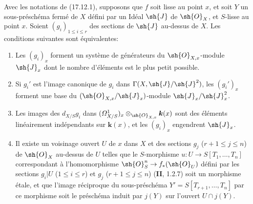 \begin{corollary}[17.12.2]
\label{IV.17.12.2}
Avec les notations de \textup{(17.12.1)}, supposons que $f$ soit lisse au point $x$, et soit $Y$ un sous-préschéma fermé de $X$ défini par un Idéal $\sh{J}$ de $\sh{O}_X$, et $S$-lisse au point $x$. Soient $(g_i)_{1\leq i\leq r}$ des sections de $\sh{J}$ au-dessus de $X$. Les conditions suivantes sont équivalentes:
\begin{enumerate}
  \item[\textup{a)}] Les $(g_i)_x$ forment un système de générateurs du $\sh{O}_{X,x}$-module $\sh{J}_x$ dont le nombre d'éléments est le plus petit possible.
  \item[\textup{b)}] Si $g_i'$ est l'image canonique de $g_i$ dans $\Gamma(X,\sh{J}/\sh{J}^2)$, les $(g_i')_x$ forment une base du $(\sh{O}_{X,x}/\sh{J}_x)$-module $\sh{J}_x/\sh{J}_x^2$.


  \item[\textup{c)}] Les images des $d_{X/S}g_i$ dans $(\varOmega^1_{X/S})_x\otimes_{\sh{O}_{X,x}}\boldsymbol{k}(x)$ sont des éléments linéairement indépendants sur $\boldsymbol{k}(x)$, et les $(g_i)_x$ engendrent $\sh{J}_x$.
  \item[\textup{d)}] Il existe un voisinage ouvert $U$ de $x$ dans $X$ et des sections $g_j$ \textup{($r+1\leq j\leq n$)} de $\sh{O}_X$ au-dessus de $U$ telles que le $S$-morphisme $u:U\to S[T_1,\ldots,T_n]$ correspondant à l'homomorphisme $\sh{O}_S^n\to f_*(\sh{O}_U)$ défini par les sections $g_i|U$ \textup{($1\leq i\leq r$)} et $g_j$ \textup{($r+1\leq j\leq n$)} \textup{(\textbf{II}, 1.2.7)} soit un morphisme étale, et que l'image réciproque du sous-préschéma $Y'=S[T_{r+1},\ldots,T_n]$ par ce morphisme soit le préschéma induit par $j(Y)$ sur l'ouvert $U\cap j(Y)$.
\end{enumerate}
\end{corollary}

